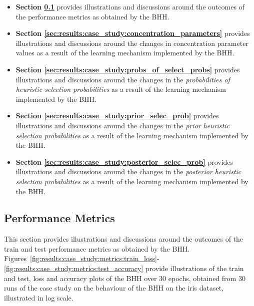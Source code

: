 \begin{itemize}
	\item \textbf{Section \ref{sec:results:case_study:performance_metrics}} provides illustrations and discussions around the outcomes of the performance metrics as obtained by the \acs{BHH}.

	\item \textbf{Section \ref{sec:results:case_study:concentration_parameters}} provides illustrations and discussions around the changes in concentration parameter values as a result of the learning mechanism implemented by the \acs{BHH}.

	\item \textbf{Section \ref{sec:results:case_study:probs_of_select_probs}} provides illustrations and discussions around the changes in the \textit{probabilities of heuristic selection probabilities} as a result of the learning mechanism implemented by the \acs{BHH}.

	\item \textbf{Section \ref{sec:results:case_study:prior_selec_prob}} provides illustrations and discussions around the changes in the \textit{prior heuristic selection probabilities} as a result of the learning mechanism implemented by the \acs{BHH}.

	\item \textbf{Section \ref{sec:results:case_study:posterior_selec_prob}} provides illustrations and discussions around the changes in the \textit{posterior heuristic selection probabilities} as a result of the learning mechanism implemented by the \acs{BHH}.


\end{itemize}

\subsection{Performance Metrics}\label{sec:results:case_study:performance_metrics}

This section provides illustrations and discussions around the outcomes of the train and test performance metrics as obtained by the \acs{BHH}. Figures~\ref{fig:results:case_study:metrics:train_loss}-\ref{fig:results:case_study:metrics:test_accuracy} provide illustrations of the train and test, loss and accuracy plots of the \acs{BHH} over 30 epochs, obtained from 30 runs of the case study on the behaviour of the \acs{BHH} on the iris dataset, illustrated in log scale.

